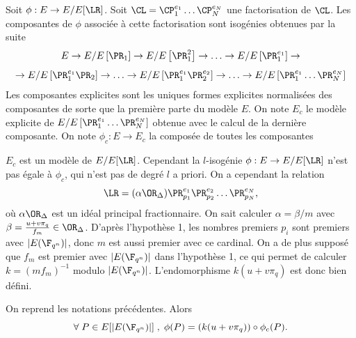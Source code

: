 \begin{Def}
	Soit $\phi : E \rightarrow E/E[\LR]$. Soit $\CL = \CP_{1}^{e_{1}} \ldots\CP_{N}^{e_{N}}$ une factorisation de $\CL$. Les composantes de $\phi$ associée à cette factorisation sont isogénies obtenues par la suite
	\begin{equation*}
		E\rightarrow E/E\left[ \PR_{1}\right] \rightarrow E/E\left[ \PR_{1}^{2}\right] \rightarrow\ldots\rightarrow E/E\left[ \PR_{1}^{e_{1}}\right] \rightarrow
	\end{equation*}
	\begin{equation*}
		\rightarrow E/E\left[ \PR_{1}^{e_{1}}\PR_{2}\right] \rightarrow\ldots\rightarrow E/E\left[ \PR_{1}^{e_{1}}\PR_{2}^{e_{2}}\right] \rightarrow\ldots\rightarrow E/E\left[\PR_{1}^{e_{1}} \ldots\PR_{N}^{e_{N}}\right]
	\end{equation*}
	Les composantes explicites sont les uniques formes explicites normalisées des composantes de sorte que la première parte du modèle $E$. On note $E_{c}$ le modèle explicite de $E/E\left[\PR_{1}^{e_{1}} \ldots\PR_{N}^{e_{N}}\right]$ obtenue avec le calcul de la dernière composante. On note $\phi_c : E\rightarrow E_c$ la composée de toutes les composantes
\end{Def}

$E_c$ est un modèle de $E/E[\LR]$. Cependant la $l$-isogénie $\phi : E \rightarrow E/E[\LR]$ n'est pas égale à $\phi_c$, qui n'est pas de degré $l$ a priori. On a cependant la relation
\begin{equation*}
	\LR = (\alpha\OR_{\Delta})\PR_{p_{1}}^{e_{1}}\PR_{p_{2}}^{e_{2}}\ldots\PR_{p_{N}}^{e_{N}},
\end{equation*}
où $\alpha\OR_{\Delta}$ est un idéal principal fractionnaire. On sait calculer $\alpha = \beta/m$ avec $\beta = \frac{u + v\pi_{q}}{f_{m}}\in\OR_{\Delta}$. D'après l'hypothèse 1, les nombres premiers $p_{i}$ sont premiers avec $|E(\F_{q^{n}})|$, donc $m$ est aussi premier avec ce cardinal. On a de plus supposé que $f_{m}$ est premier avec $|E(\F_{q^{n}})|$ dans l'hypothèse 1, ce qui permet de calculer $k = (mf_{m})^{-1}$ modulo $|E(\F_{q^{n}})|$. L'endomorphisme $k(u + v\pi_{q})$ est donc bien défini. 

\begin{Prop}
	On reprend les notations précédentes. Alors
	\begin{equation*}
		\forall\; P\in E[|E(\F_{q^{n}})|]\;,\;\phi(P) = (k(u + v\pi_{q}))\circ\phi_c(P).
	\end{equation*}
\end{Prop}

